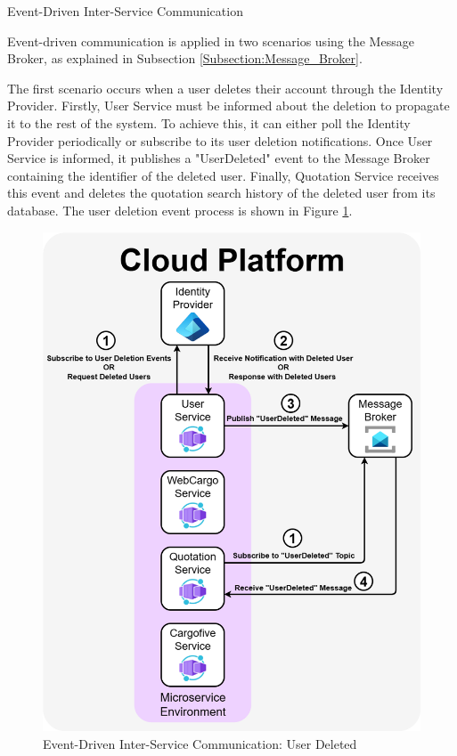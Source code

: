 \documentclass[12pt,reqno, oneside]{amsbook}
\makeatletter
\def\subsection{\@startsection{subsection}{2}%
      \z@{.5\linespacing\@plus.7\linespacing}{.25\linespacing}%
      {\normalfont\bfseries\flushleft}}
\theoremstyle{definition}
\theoremstyle{definition}
\numberwithin{section}{chapter}
\numberwithin{table}{chapter}
\numberwithin{figure}{chapter}
\makeatother
\begin{document}
\subsection{Event-Driven Inter-Service Communication}
\label{Subsection:Event_Driven_Inter_Service_Communication}

Event-driven communication is applied in two scenarios using the Message Broker, as explained in Subsection \ref{Subsection:Message_Broker}.

The first scenario occurs when a user deletes their account through the Identity Provider.
Firstly, User Service must be informed about the deletion to propagate it to the rest of the system. To achieve this, it can either poll the Identity Provider periodically or subscribe to its user deletion notifications. Once User Service is informed, it publishes a "UserDeleted" event to the Message Broker containing the identifier of the deleted user. Finally, Quotation Service receives this event and deletes the quotation search history of the deleted user from its database. The user deletion event process is shown in Figure \ref{Figure:EventDrivenCommunicationUserDeleted}.

\begin{figure}[H]
  \centering
  \includegraphics[width=0.9\linewidth]{images/EventDrivenCommunicationUserDeleted.png}
  \caption{\label{Figure:EventDrivenCommunicationUserDeleted}Event-Driven Inter-Service Communication: User Deleted}
\end{figure}
\end{document}

